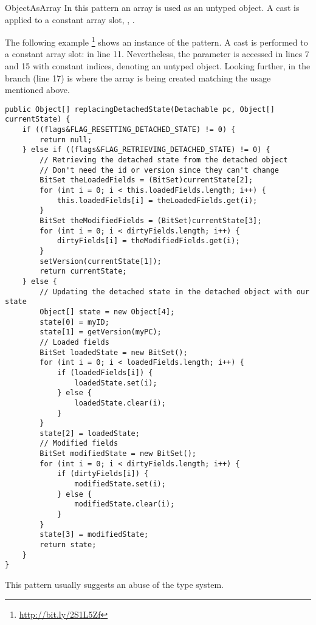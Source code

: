 \begin{pattern}{ObjectAsArray}
In this pattern an array is used as an untyped object.
A cast is applied to a constant array slot, \eg, .

\instances{}
The following example%
\footnote{\url{http://bit.ly/2S1L5Zf}}
shows an instance of the \thisp{} pattern.
A cast is performed to a constant array slot:  in line 11.
Nevertheless, the  parameter is accessed in lines 7 and 15 with constant indices, denoting an untyped object.
Looking further, in the  branch (line 17) is where the array is being created matching the usage mentioned above.

\begin{verbatim}
public Object[] replacingDetachedState(Detachable pc, Object[] currentState) {
    if ((flags&FLAG_RESETTING_DETACHED_STATE) != 0) {
        return null;
    } else if ((flags&FLAG_RETRIEVING_DETACHED_STATE) != 0) {
        // Retrieving the detached state from the detached object
        // Don't need the id or version since they can't change
        BitSet theLoadedFields = (BitSet)currentState[2];
        for (int i = 0; i < this.loadedFields.length; i++) {
            this.loadedFields[i] = theLoadedFields.get(i);
        }
        BitSet theModifiedFields = (BitSet)currentState[3];
        for (int i = 0; i < dirtyFields.length; i++) {
            dirtyFields[i] = theModifiedFields.get(i);
        }
        setVersion(currentState[1]);
        return currentState;
    } else {
        // Updating the detached state in the detached object with our state
        Object[] state = new Object[4];
        state[0] = myID;
        state[1] = getVersion(myPC);
        // Loaded fields
        BitSet loadedState = new BitSet();
        for (int i = 0; i < loadedFields.length; i++) {
            if (loadedFields[i]) {
                loadedState.set(i);
            } else {
                loadedState.clear(i);
            }
        }
        state[2] = loadedState;
        // Modified fields
        BitSet modifiedState = new BitSet();
        for (int i = 0; i < dirtyFields.length; i++) {
            if (dirtyFields[i]) {
                modifiedState.set(i);
            } else {
                modifiedState.clear(i);
            }
        }
        state[3] = modifiedState;
        return state;
    }
}
\end{verbatim}

\detection{}

\discussion{}
%
%
This pattern usually suggests an abuse of the type system.

\related{}

\end{pattern}